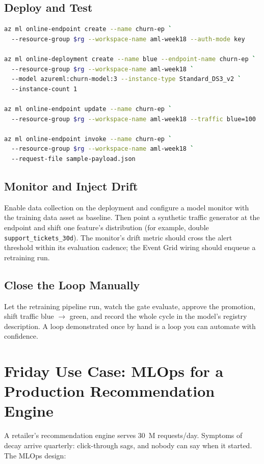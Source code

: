 \subsection{Deploy and Test}
\begin{lstlisting}[language=bash,caption={Endpoint, deployment, and a scored test payload.},label={lst:ch19-endpoint}]
az ml online-endpoint create --name churn-ep `
  --resource-group $rg --workspace-name aml-week18 --auth-mode key

az ml online-deployment create --name blue --endpoint-name churn-ep `
  --resource-group $rg --workspace-name aml-week18 `
  --model azureml:churn-model:3 --instance-type Standard_DS3_v2 `
  --instance-count 1

az ml online-endpoint update --name churn-ep `
  --resource-group $rg --workspace-name aml-week18 --traffic blue=100

az ml online-endpoint invoke --name churn-ep `
  --resource-group $rg --workspace-name aml-week18 `
  --request-file sample-payload.json
\end{lstlisting}

\subsection{Monitor and Inject Drift}
Enable data collection on the deployment and configure a model monitor with the training data asset as baseline. Then point a synthetic traffic generator at the endpoint and shift one feature's distribution (for example, double \texttt{support\_tickets\_30d}). The monitor's drift metric should cross the alert threshold within its evaluation cadence; the Event Grid wiring should enqueue a retraining run.

\subsection{Close the Loop Manually}
Let the retraining pipeline run, watch the gate evaluate, approve the promotion, shift traffic blue $\rightarrow$ green, and record the whole cycle in the model's registry description. A loop demonstrated once by hand is a loop you can automate with confidence.

\section{Friday Use Case: MLOps for a Production Recommendation Engine}
A retailer's recommendation engine serves 30~M requests/day. Symptoms of decay arrive quarterly: click-through sags, and nobody can say when it started. The MLOps design:

